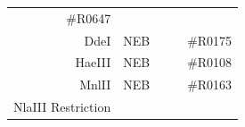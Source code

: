 \documentclass[11pt,singlespacinge,twoside]{reedthesis} %
\begin{document}
\begin{longtable}[]{@{}rccll@{}}
\begin{minipage}[t]{0.11\columnwidth}
\#R0647\strut
\end{minipage}\tabularnewline
\begin{minipage}[t]{0.24\columnwidth}\raggedleft
DdeI\strut
\end{minipage} & \begin{minipage}[t]{0.16\columnwidth}\centering
NEB\strut
\end{minipage} & \begin{minipage}[t]{0.12\columnwidth}\centering
\strut
\end{minipage} & \begin{minipage}[t]{0.24\columnwidth}\raggedright
\strut
\end{minipage} & \begin{minipage}[t]{0.11\columnwidth}\raggedright
\#R0175\strut
\end{minipage}\tabularnewline
\begin{minipage}[t]{0.24\columnwidth}\raggedleft
HaeIII\strut
\end{minipage} & \begin{minipage}[t]{0.16\columnwidth}\centering
NEB\strut
\end{minipage} & \begin{minipage}[t]{0.12\columnwidth}\centering
\strut
\end{minipage} & \begin{minipage}[t]{0.24\columnwidth}\raggedright
\strut
\end{minipage} & \begin{minipage}[t]{0.11\columnwidth}\raggedright
\#R0108\strut
\end{minipage}\tabularnewline
\begin{minipage}[t]{0.24\columnwidth}\raggedleft
MnlII\strut
\end{minipage} & \begin{minipage}[t]{0.16\columnwidth}\centering
NEB\strut
\end{minipage} & \begin{minipage}[t]{0.12\columnwidth}\centering
\strut
\end{minipage} & \begin{minipage}[t]{0.24\columnwidth}\raggedright
\strut
\end{minipage} & \begin{minipage}[t]{0.11\columnwidth}\raggedright
\#R0163\strut
\end{minipage}\tabularnewline
\begin{minipage}[t]{0.24\columnwidth}\raggedleft
NlaIII Restriction\strut
\end{minipage} & \begin{minipage}[t]{0.16\columnwidth}\centering

\end{minipage}
\end{longtable}
\end{document}
